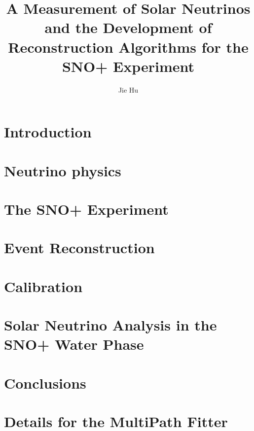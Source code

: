 \documentclass[phd,black]{PrincetonThesis}
\title{A Measurement of Solar Neutrinos and the Development of Reconstruction Algorithms for the SNO+ Experiment}
\author{Jie Hu}
\begin{document}
\begin{frontmatter}
  
\begin{thesisabstract}

\end{thesisabstract}

\begin{preface}
	
\end{preface}

\begin{acknowledgements}

\end{acknowledgements}
 
\end{frontmatter}

\cleardoublepage
\chapter{Introduction}

\chapter{Neutrino physics}

\chapter{The SNO+ Experiment}

\chapter{Event Reconstruction}

\chapter{Calibration}

\chapter{Solar Neutrino Analysis in the SNO+ Water Phase}

\chapter{Conclusions}


\appendix
\cleardoublepage
\chapter{Details for the MultiPath Fitter}


\end{document}
